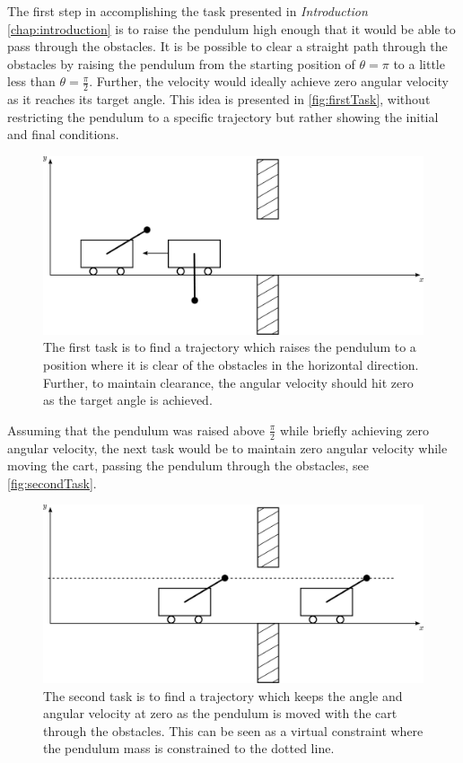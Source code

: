 
The first step in accomplishing the task presented in \textit{Introduction} \autoref{chap:introduction} is to raise the pendulum high enough that it would be able to pass through the obstacles. It is be possible to clear a straight path through the obstacles by raising the pendulum from the starting position of $\theta = \pi$ to a little less than $\theta = \frac{\pi}{2}$. Further, the velocity would ideally achieve zero angular velocity as it reaches its target angle. This idea is presented in \autoref{fig:firstTask}, without restricting the pendulum to a specific trajectory but rather showing the initial and final conditions.

\begin{figure}[H]
  \includegraphics[width=.5\textwidth]{figures/firstTask}
  \caption{The first task is to find a trajectory which raises the pendulum to a position where it is clear of the obstacles in the horizontal direction. Further, to maintain clearance, the angular velocity should hit zero as the target angle is achieved.}
  \label{fig:firstTask}
\end{figure}
%
%
Assuming that the pendulum was raised above $\frac{\pi}{2}$ while briefly achieving zero angular velocity, the next task would be to maintain zero angular velocity while moving the cart, passing the pendulum through the obstacles, see \autoref{fig:secondTask}.

\begin{figure}[H]
  \includegraphics[width=.5\textwidth]{figures/secondTask}
  \caption{The second task is to find a trajectory which keeps the angle and angular velocity at zero as the pendulum is moved with the cart through the obstacles. This can be seen as a virtual constraint where the pendulum mass is constrained to the dotted line.}
  \label{fig:secondTask}
\end{figure}

